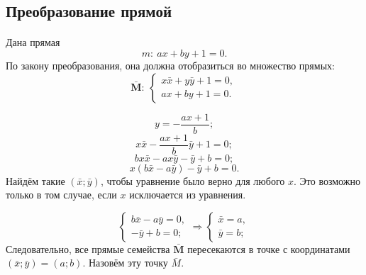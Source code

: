 \subsection{Преобразование прямой}
\paragraph{} Дана прямая 
$$m: \: ax + by + 1 = 0.$$
По закону преобразования, она должна отобразиться во множество прямых:
$$\mathbf{\bar{M}}: \:
\left\{
	\begin{array}{l}
		x\bar{x} + y\bar{y} + 1 = 0,\\
		ax + by + 1 = 0.
	\end{array}
\right.
$$

$$y = -\frac{ax+1}{b};$$
$$x\bar{x} -\frac{ax+1}{b}\bar{y} + 1 = 0;$$
$$bx\bar{x} -ax\bar{y} - \bar{y} + b = 0;$$
$$x \left(b\bar{x} - a\bar{y} \right) - \bar{y} + b = 0.$$
Найдём такие $(\bar{x}; \bar{y})$, чтобы уравнение было верно для любого $x$. Это возможно только в том случае, если $x$ исключается из уравнения.

$$
\left\{
	\begin{array}{l}
		b\bar{x} - a\bar{y} = 0,\\
		- \bar{y} + b = 0;
	\end{array}
\right.
\Rightarrow
\left\{
	\begin{array}{l}
		\bar{x} = a,\\
		\bar{y} = b;
	\end{array}
\right.
$$
Следовательно, все прямые семейства $\mathbf{\bar{M}}$ пересекаются в точке с координатами $(\bar{x}; \bar{y}) = (a; b)$. Назовём эту точку $\bar{M}$.